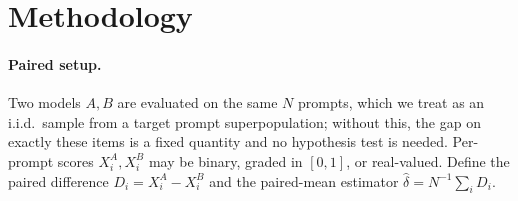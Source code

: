 \documentclass{article}
\theoremstyle{plain}
\theoremstyle{definition}
\begin{document}
\section{Methodology}
\label{sec:framework}

\paragraph{Paired setup.} Two models $A, B$ are evaluated on the same $N$ prompts, which we treat as an i.i.d.\ sample from a target prompt superpopulation; without this, the gap on exactly these items is a fixed quantity and no hypothesis test is needed. Per-prompt scores $X_i^A, X_i^B$ may be binary, graded in $[0,1]$, or real-valued. Define the paired difference $D_i = X_i^A - X_i^B$ and the paired-mean estimator $\hat\delta = N^{-1}\sum_i D_i$.
\end{document}
